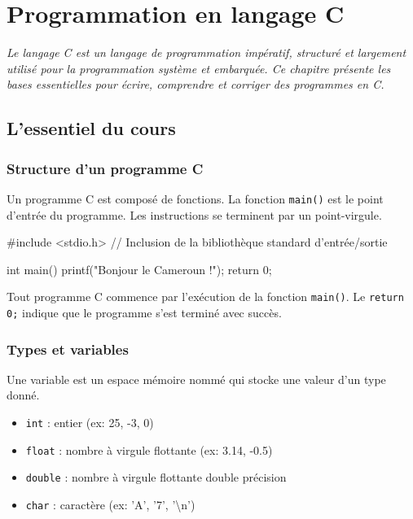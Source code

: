 \chapter{Programmation en langage C}

\textit{Le langage C est un langage de programmation impératif, structuré et largement utilisé pour la programmation système et embarquée. Ce chapitre présente les bases essentielles pour écrire, comprendre et corriger des programmes en C.}

\section{L'essentiel du cours}

\subsection{Structure d'un programme C}

Un programme C est composé de fonctions. La fonction \texttt{main()} est le point d'entrée du programme. Les instructions se terminent par un point-virgule.

\begin{ccode}
#include <stdio.h>   // Inclusion de la bibliothèque standard d'entrée/sortie

int main() {
    printf("Bonjour le Cameroun !\n");
    return 0;
}
\end{ccode}

\begin{aretenir}
Tout programme C commence par l'exécution de la fonction \texttt{main()}. Le \texttt{return 0;} indique que le programme s'est terminé avec succès.
\end{aretenir}

\subsection{Types et variables}

Une variable est un espace mémoire nommé qui stocke une valeur d'un type donné.

\begin{definition}
\begin{itemize}
    \item \texttt{int} : entier (ex: 25, -3, 0)
    \item \texttt{float} : nombre à virgule flottante (ex: 3.14, -0.5)
    \item \texttt{double} : nombre à virgule flottante double précision
    \item \texttt{char} : caractère (ex: 'A', '7', '\textbackslash n')
\end{itemize}
\end{definition}

